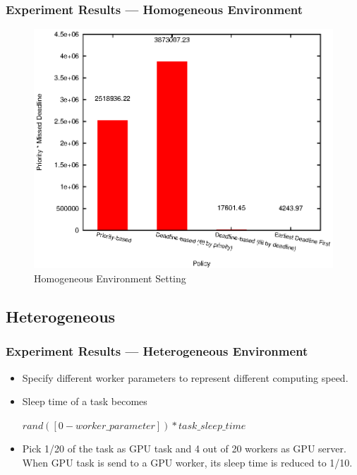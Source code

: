 \begin{frame}
  \frametitle{Experiment Results --- Homogeneous Environment}
  \begin{figure}[htbp]
    \centering
    \includegraphics[width=\textwidth,height=0.7\textheight,keepaspectratio]{figures/homo.eps}
    \caption{Homogeneous Environment Setting}
    \label{fig:homo-exp}
  \end{figure}
\end{frame}

\subsection{Heterogeneous}
\begin{frame}
  \frametitle{Experiment Results --- Heterogeneous Environment}
  \begin{itemize}
    \item Specify different worker parameters to represent different
      computing speed.
    \item Sleep time of a task becomes
      \begin{center}\begin{minipage}{.7\textwidth}
        \begin{exampleblock}{}
          \centering
          $rand([0-worker\_parameter])*task\_sleep\_time$
        \end{exampleblock}
      \end{minipage}\end{center}
    \item Pick 1/20 of the task as GPU task and 4 out of 20 workers as
      GPU server.  When GPU task is send to a GPU worker, its sleep
      time is reduced to 1/10.
  \end{itemize}
\end{frame}

